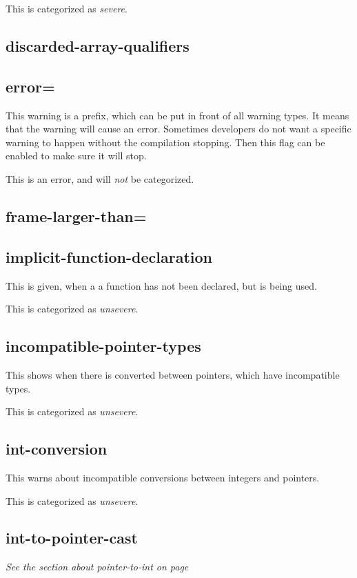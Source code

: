 \documentclass[a4paper,11pt]{report}
\begin{document}
This is categorized as \emph{severe}.


            \subsection*{discarded-array-qualifiers}
            \subsection*{error=}
This warning is a prefix, which can be put in front of all warning types. It 
means that the warning will cause an error. Sometimes developers do not want a 
specific warning to happen without the compilation stopping. Then this flag can 
be enabled to make sure it will stop.

This is an error, and will \emph{not} be categorized.


            \subsection*{frame-larger-than=}


            \subsection*{implicit-function-declaration}
This is given, when a a function has not been declared, but is being used.

This is categorized as \emph{unsevere}.


            \subsection*{incompatible-pointer-types}
This shows when there is converted between pointers, which have incompatible 
types.

This is categorized as \emph{unsevere}.


            \subsection*{int-conversion}
This warns about incompatible conversions between integers and pointers.

This is categorized as \emph{unsevere}.

            \subsection*{int-to-pointer-cast}
\emph{See the section about pointer-to-int on page \pageref{par:pointertoint}}
\end{document}
